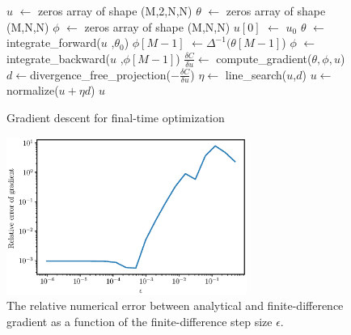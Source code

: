 \begin{figure}

\begin{algorithmic}[1]
\State$u$ $\gets$ zeros array of shape (M,2,N,N)
\State $\theta$ $\gets$ zeros array of shape (M,N,N)
\State $\phi$ $\gets$ zeros array of shape (M,N,N)
\State
\State $u[0]$ $\gets$ $u_0$
\State
	\State  $\theta$ $\gets$ integrate\_forward($u$ ,$\theta_0$)
	\State  $\phi[M-1]$  $\gets  \Delta^{-1}(\theta[M-1]$)
	\State $\phi$ $\gets$ integrate\_backward($u$ ,$\phi[M-1]$)
	\State
	\State  $\frac{\delta C}{\delta u} \gets$ compute\_gradient($\theta,\phi,u$)
	\State  $d \gets  $divergence\_free\_projection($-\frac{\delta C}{\delta u} $)
	\State $\eta  \gets$ line\_search($u$,$d$)
	\State $u \gets$ normalize($u + \eta d$)
\EndWhile
\State	
\Return $u$
\EndFunction
\end{algorithmic}
\caption{Gradient descent for final-time optimization}
\label{fig:GD-algorithm}
\end{figure}

\begin{figure}
\centering
\includegraphics[width=0.7\textwidth]{ch-git/images/gradient}
\caption{The relative numerical error between analytical and finite-difference gradient as a function of the finite-difference step size $\epsilon$.}
\label{fig:gradient}
\end{figure}

